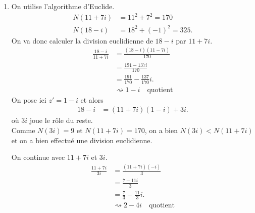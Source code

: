 {\begin{td-sol}[]
\begin{enumerate}
            \item On utilise l'algorithme d'Euclide.
            \begin{equation*}
                \begin{aligned}
                    N(11 + 7i) &= 11^2 + 7^2 = 170\\
                    N(18 - i) &= 18^2 + {(-1)}^2 = 325.
                \end{aligned}
            \end{equation*}
            On va donc calculer la division euclidienne de \(18-i\) par \(11+7i\).
            \begin{equation*}
                \begin{aligned}
                    \frac{18-i}{11+7i}
                    &= \frac{(18-i)(11-7i)}{170}\\
                    &= \frac{191-137i}{170}\\
                    &= \frac{191}{170} - \frac{137}{170}i.\\
                    &\rightsquigarrow 1 - i\quad\text{quotient}
                \end{aligned}
            \end{equation*}
            On pose ici \(z' = 1-i\) et alors
            \begin{equation*}
                \begin{aligned}
                    18 - i
                    &= (11+7i)(1-i) + 3i.
                \end{aligned}
            \end{equation*}
            où \(3i\) joue le rôle du reste.\\
            Comme \(N(3i) = 9\) et \(N(11+7i) = 170\), on a bien \(N(3i) < N(11+7i)\)
            et on a bien effectué une division euclidienne.

            On continue avec \(11+7i\) et \(3i\).
            \begin{equation*}
                \begin{aligned}
                    \frac{11+7i}{3i}
                    &= \frac{(11+7i)(-i)}{3}\\
                    &= \frac{7-11i}{3}\\
                    &= \frac{7}{3} - \frac{11}{3}i.\\
                    &\rightsquigarrow 2 - 4i\quad\text{quotient}
                \end{aligned}
            \end{equation*}


\end{enumerate}
\end{td-sol}}
